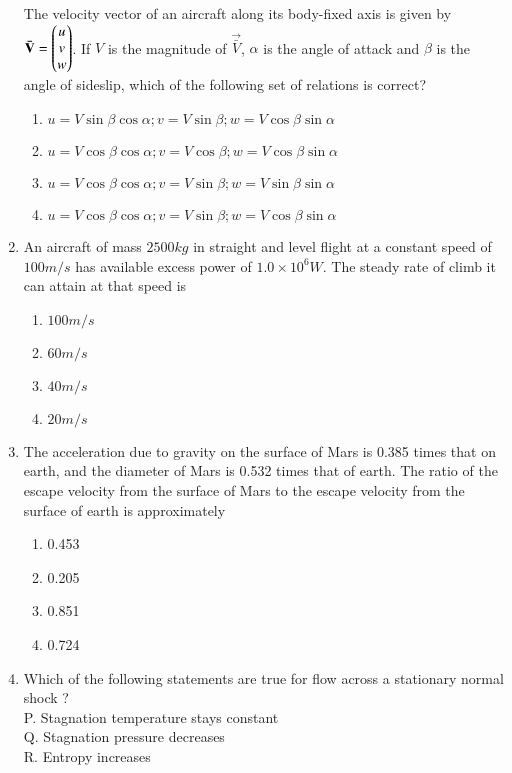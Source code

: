 \documentclass[journal]{IEEEtran}
\begin{document}
\begin{enumerate}
	The velocity vector of an aircraft along its body-fixed axis is given by $\mathbf{\bar{V}} = \begin{pmatrix}u \\ v \\ w\end{pmatrix}$. If $V$ is the magnitude of $\vec{\bar{V}}$, $\alpha$ is the angle of attack and $\beta$ is the angle of sideslip, which of the following set of relations is correct?
		\begin{enumerate}
			\item $u = V\sin{\beta}\cos{\alpha}; v = V\sin{\beta}; w = V\cos{\beta}\sin{\alpha}$
			\item $u = V\cos{\beta}\cos{\alpha}; v = V\cos{\beta}; w = V\cos{\beta}\sin{\alpha}$
			\item $u = V\cos{\beta}\cos{\alpha}; v = V\sin{\beta}; w = V\sin{\beta}\sin{\alpha}$
			\item $u = V\cos{\beta}\cos{\alpha}; v = V\sin{\beta}; w = V\cos{\beta}\sin{\alpha}$
		\end{enumerate}
	\item
	An aircraft of mass $2500 kg$ in straight and level flight at a constant speed of $100 m/s$ has available excess power of $1.0 \times 10^6 W$. The steady rate of climb it can attain at that speed is 
		\begin{enumerate}
			\item $100 m/s$
			\item $60 m/s$
			\item $40 m/s$
			\item $20 m/s$
		\end{enumerate}
	\item
	The acceleration due to gravity on the surface of Mars is 0.385 times that on earth, and the diameter of Mars is 0.532 times that of earth. The ratio of the escape velocity from the surface of Mars to the escape velocity from the surface of earth is approximately
		\begin{enumerate}
			\item 0.453
			\item 0.205
			\item 0.851
			\item 0.724
		\end{enumerate}
	\item
	Which of the following statements are true for flow across a stationary normal shock ? \\
	P.      Stagnation temperature stays constant \\
	Q.	Stagnation pressure decreases \\
	R.	Entropy increases \\

\end{enumerate}
\end{document}
